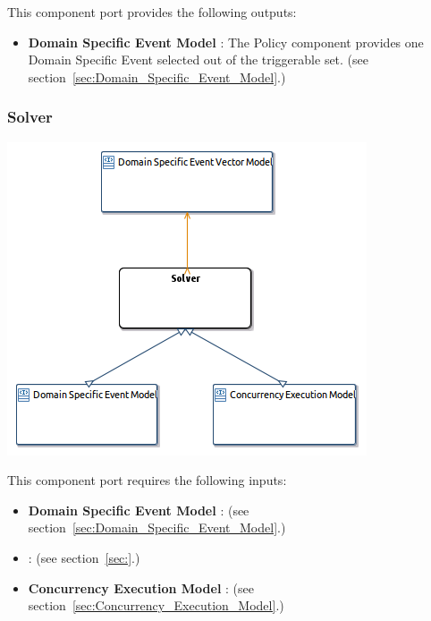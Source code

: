 \documentclass{gemoc} %
\begin{document}
This component port provides the following outputs:
\begin{itemize}
  \item \textbf{Domain Specific Event Model} :
The Policy component provides one Domain Specific Event selected out of the triggerable set.
(see section~\ref{sec:Domain_Specific_Event_Model}.)
\end{itemize}


\subsubsection{Solver}
\label{sec:Solver}


\begin{center}
\includegraphics*[trim=0.0cm 0.0cm 0cm 0.0cm, clip=true]{../images/generated/Generated_Solver.png}
\end{center}

This component port requires the following inputs:
\begin{itemize}
  \item \textbf{Domain Specific Event Model} :
(see section~\ref{sec:Domain_Specific_Event_Model}.)
  \item \textbf{} :
(see section~\ref{sec:}.)
  \item \textbf{Concurrency Execution Model} :
(see section~\ref{sec:Concurrency_Execution_Model}.)
\end{itemize}
\end{document}
